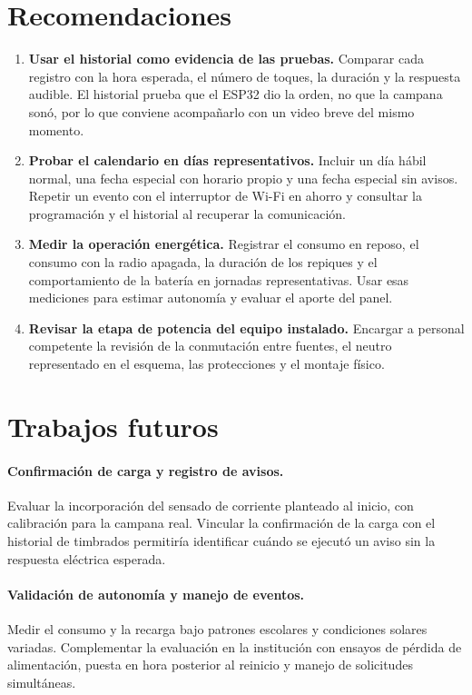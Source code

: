 \documentclass[a4paper,11pt]{article}
\begin{document}
\section{Recomendaciones}
\begin{enumerate}
  \item \textbf{Usar el historial como evidencia de las pruebas.} Comparar cada registro con la hora esperada, el número de toques, la duración y la respuesta audible. El historial prueba que el ESP32 dio la orden, no que la campana sonó, por lo que conviene acompañarlo con un video breve del mismo momento.
  \item \textbf{Probar el calendario en días representativos.} Incluir un día hábil normal, una fecha especial con horario propio y una fecha especial sin avisos. Repetir un evento con el interruptor de Wi-Fi en ahorro y consultar la programación y el historial al recuperar la comunicación.
  \item \textbf{Medir la operación energética.} Registrar el consumo en reposo, el consumo con la radio apagada, la duración de los repiques y el comportamiento de la batería en jornadas representativas. Usar esas mediciones para estimar autonomía y evaluar el aporte del panel.
  \item \textbf{Revisar la etapa de potencia del equipo instalado.} Encargar a personal competente la revisión de la conmutación entre fuentes, el neutro representado en el esquema, las protecciones y el montaje físico.
\end{enumerate}

\clearpage
\section{Trabajos futuros}
\paragraph{Confirmación de carga y registro de avisos.}
Evaluar la incorporación del sensado de corriente planteado al inicio, con calibración para la campana real. Vincular la confirmación de la carga con el historial de timbrados permitiría identificar cuándo se ejecutó un aviso sin la respuesta eléctrica esperada.

\paragraph{Validación de autonomía y manejo de eventos.}
Medir el consumo y la recarga bajo patrones escolares y condiciones solares variadas. Complementar la evaluación en la institución con ensayos de pérdida de alimentación, puesta en hora posterior al reinicio y manejo de solicitudes simultáneas.
\end{document}
